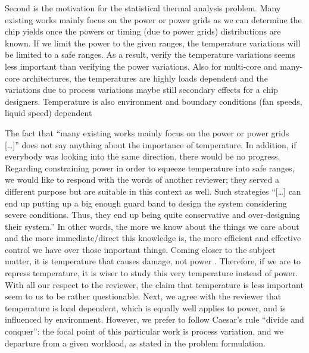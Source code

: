 \begin{reviewer}
Second is the motivation for the statistical thermal analysis problem. Many existing works mainly focus on the power or power grids as we can determine the chip yields once the powers or timing (due to power grids) distributions are known. If we limit the power to the given ranges, the temperature variations will be limited to a safe ranges. As a result, verify the temperature variations seems less important than verifying the power variations.  Also for multi-core and many-core architectures, the temperatures are highly loads dependent and the variations due to process variations maybe still secondary effects for a chip designers. Temperature is also environment and boundary conditions (fan speeds, liquid speed) dependent
\end{reviewer}
\begin{authors}
The fact that ``many existing works mainly focus on the power or power grids [\ldots]'' does not say anything about the importance of temperature.
In addition, if everybody was looking into the same direction, there would be no progress.
Regarding constraining power in order to squeeze temperature into safe ranges, we would like to respond with the words of another reviewer; they served a different purpose but are suitable in this context as well.
Such strategies ``[\ldots] can end up putting up a big enough guard band to design the system considering severe conditions.
Thus, they end up being quite conservative and over-designing their system.''
In other words, the more we know about the things we care about and the more immediate/direct this knowledge is, the more efficient and effective control we have over those important things.
Coming closer to the subject matter, it is temperature that causes damage, not power \perse.
Therefore, if we are to repress temperature, it is wiser to study this very temperature instead of power.
With all our respect to the reviewer, the claim that temperature is less important seem to us to be rather questionable.
Next, we agree with the reviewer that temperature is load dependent, which is equally well applies to power, and is influenced by environment.
However, we prefer to follow Caesar’s rule ``divide and conquer'': the focal point of this particular work is process variation, and we departure from a given workload, as stated in the problem formulation.
\end{authors}

